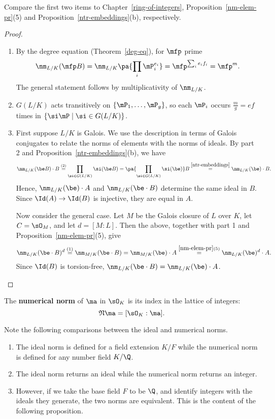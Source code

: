Compare the first two items to Chapter~\ref{ring-of-integers}, Proposition~\ref{nm-elem-pr}(5) and Proposition~\ref{ntr-embeddings}(b), respectively.
\begin{proof}$\,$
\begin{enumerate}
\item
By the degree equation (Theorem~\ref{deg-eq}), for $\mfp$ prime
\[
\nm_{L/K}(\mfp B)=\nm_{L/K}\pa{\prod_i \mP_i^{e_i}}=\mfp^{\sum_{i} e_if_i}=\mfp^m.
\]
The general statement follows by multiplicativity of $\nm_{L/K}$.
\item $G(L/K)$ acts transitively on $\{\mP_1,\ldots, \mP_g\}$, so each $\mP_i$ occurs $\frac{m}{g}=ef$ times in $\{\si \mP\mid \si\in G(L/K)\}$.
\item 
First suppose $L/K$ is Galois. We use the description in terms of Galois conjugates to relate the norms of elements with the norms of ideals.
By part 2 and Proposition~\ref{ntr-embeddings}(b), we have
\[
\nm_{L/K}(\be B)\cdot B\stackrel{(2)}=\prod_{\si\in G(L/K)} \si(\be B) =\pa{\prod_{\si\in G(L/K)}\si(\be)}B\stackrel{\ref{ntr-embeddings}}=\nm_{L/K}(\be) \cdot B.
\]
Hence, $\nm_{L/K}(\be)\cdot A$ and $\nm_{L/K}(\be\cdot B)$ determine the same ideal in $B$. Since $\Id(A)\to \Id(B)$ is injective, they are equal in $A$.

Now consider the general case. Let $M$ be the Galois closure of $L$ over $K$, let $C=\sO_M$, and let $d=[M:L]$. Then the above, together with part 1 and Proposition~\ref{nm-elem-pr}(5), give
\[
\nm_{L/K}(\be\cdot B)^d\stackrel{(1)}= \nm_{M/K}(\be\cdot B)=\nm_{M/K}(\be) \cdot A \stackrel{\ref{nm-elem-pr}(5)}= \nm_{L/K}(\be)^d\cdot A.
\]
Since $\Id(B)$ is torsion-free, $\nm_{L/K}(\be\cdot B)=\nm_{L/K}(\be)\cdot A$.\qedhere
\end{enumerate}
\end{proof}
\begin{df}
The \textbf{numerical norm} of $\ma$ in $\sO_K$ is its index in the lattice of integers:
\[
\mathfrak N \ma =[\sO_K:\ma].
\]
\end{df}
Note the following comparisons between the ideal and numerical norms.
\begin{enumerate}
\item The ideal norm is defined for a field extension $K/F$ while the numerical norm is defined for any number field $K/\Q$.
\item The ideal norm returns an ideal while the numerical norm returns an integer.
\item However, if we take the base field $F$ to be $\Q$, and identify integers with the ideals they generate, the two norms are equivalent. This is the content of the following proposition.
\end{enumerate}
